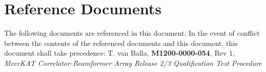 \section{Reference Documents}
The following documents are referenced in this document. In the event of conflict between the contents of the referenced documents and this document, this document shall take precedence:\newline\newline
[2]\hspace{10mm} T. van Balla, {\bf M1200-0000-054}, Rev 1, {\it MeerKAT Correlator-Beamformer Array Release 2/3 Qualification Test Procedure}\newline

